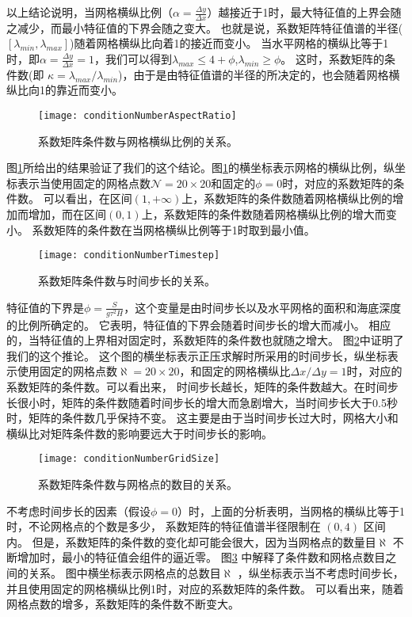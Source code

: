 以上结论说明，当网格横纵比例（$\alpha  = \frac{ \Delta y}{ \Delta x }$）越接近于1时，最大特征值的上界会随之减少，而最小特征值的下界会随之变大。
也就是说，系数矩阵特征值谱的半径($[\lambda_{min}, \lambda_{max}]$)随着网格横纵比向着1的接近而变小。 
当水平网格的横纵比等于1时，即$ \alpha = \frac{ \Delta y}{ \Delta x} = 1$，我们可以得到$\lambda_{max} \le  4 +\phi$,$\lambda_{min} \ge   \phi$。
这时，系数矩阵的条件数(即 $\kappa=  \lambda_{max}/\lambda_{min}$)，由于是由特征值谱的半径的所决定的，也会随着网格横纵比向1的靠近而变小。 

\begin{figure}[ht]
\centering
\texttt{[image: conditionNumberAspectRatio]}
\caption[] {系数矩阵条件数与网格横纵比例的关系。 \label{fig:conditionNumberRatio}}
\end{figure}
图\ref{fig:conditionNumberRatio}所给出的结果验证了我们的这个结论。图\ref{fig:conditionNumberRatio}的横坐标表示网格的横纵比例，纵坐标表示当使用固定的网格点数$\mathcal{N} = 20\times 20$和固定的$\phi = 0$时，对应的系数矩阵的条件数。 
可以看出，在区间$(1, +\infty)$上，系数矩阵的条件数随着网格横纵比例的增加而增加，而在区间$(0,1)$上，系数矩阵的条件数随着网格横纵比例的增大而变小。
系数矩阵的条件数在当网格横纵比例等于1时取到最小值。
 
\begin{figure}[ht]
\centering
\texttt{[image: conditionNumberTimestep]}
\caption[] {系数矩阵条件数与时间步长的关系。 \label{fig:conditionNumberDt}}
\end{figure}
特征值的下界是$\phi=\frac{S }{g \tau^2 H}$，这个变量是由时间步长以及水平网格的面积和海底深度的比例所确定的。
它表明，特征值的下界会随着时间步长的增大而减小。 
相应的，当特征值的上界相对固定时，系数矩阵的条件数也就随之增大。
图\ref{fig:conditionNumberDt}中证明了我们的这个推论。
这个图的横坐标表示正压求解时所采用的时间步长，纵坐标表示使用固定的网格点数$\aleph= 20\times 20$，和固定的网格横纵比$\Delta x /{\Delta y} = 1$时，对应的系数矩阵的条件数。可以看出来， 时间步长越长，矩阵的条件数越大。在时间步长很小时，矩阵的条件数随着时间步长的增大而急剧增大，当时间步长大于0.5秒时，矩阵的条件数几乎保持不变。
这主要是由于当时间步长过大时，网格大小和横纵比对矩阵条件数的影响要远大于时间步长的影响。

\begin{figure}[ht]
\centering
\texttt{[image: conditionNumberGridSize]}
\caption[] {系数矩阵条件数与网格点的数目的关系。 \label{fig:conditionNumbGrid}}
\end{figure}
 
不考虑时间步长的因素（假设$\phi=0$）时，上面的分析表明，当网格的横纵比等于1时，不论网格点的个数是多少， 系数矩阵的特征值谱半径限制在 $(0,4)$ 区间内。
但是，系数矩阵的条件数的变化却可能会很大，因为当网格点的数量目$\aleph$ 不断增加时，最小的特征值会组件的逼近零。 
图\ref{fig:conditionNumbGrid} 中解释了条件数和网格点数目之间的关系。 
图中横坐标表示网格点的总数目$\aleph$ ，纵坐标表示当不考虑时间步长，并且使用固定的网格横纵比例1时，对应的系数矩阵的条件数。
可以看出来，随着网格点数的增多，系数矩阵的条件数不断变大。




